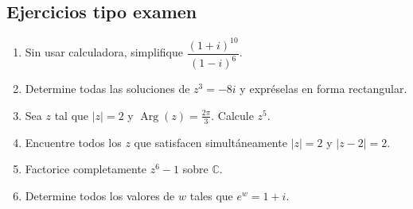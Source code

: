 \documentclass[12pt]{article}
\begin{document}
\subsection*{Ejercicios tipo examen}
\begin{enumerate}
\item Sin usar calculadora, simplifique $\dfrac{(1+i)^{10}}{(1-i)^6}$.
\item Determine todas las soluciones de $z^3=-8i$ y expréselas en forma rectangular.
\item Sea $z$ tal que $|z|=2$ y $\operatorname{Arg}(z)=\frac{2\pi}{3}$. Calcule $z^5$.
\item Encuentre todos los $z$ que satisfacen simultáneamente $|z|=2$ y $|z-2|=2$.
\item Factorice completamente $z^6-1$ sobre $\mathbb{C}$.
\item Determine todos los valores de $w$ tales que $e^w=1+i$.
\end{enumerate}

	
\end{document}
